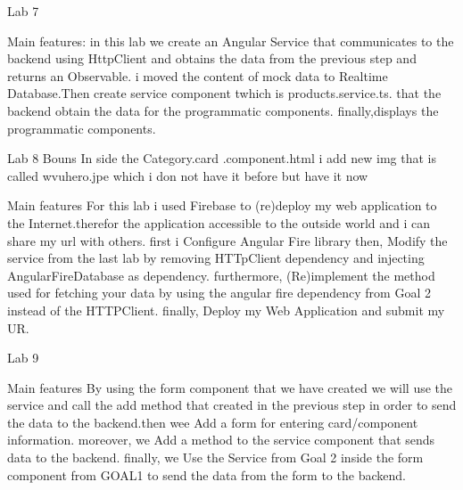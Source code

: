 Lab 7

Main features:
in this lab we create an Angular Service that communicates to the backend using HttpClient and obtains the data from the previous step and returns an Observable. 
i moved the content of mock data to Realtime Database.Then create service component twhich  is products.service.ts. that the backend obtain the data for the programmatic components.
finally,displays the programmatic components.



Lab 8
 Bouns 
 In side the Category.card .component.html i add new img that is called wvuhero.jpe which i don not have it before but have it now 

 Main features
 For this lab i used Firebase to (re)deploy my web application to the Internet.therefor the application accessible to the outside world and i can share my url with others.
first i Configure Angular Fire library then, Modify the service from the last lab by removing HTTpClient dependency and injecting AngularFireDatabase as dependency.
furthermore, (Re)implement the method used for fetching your data by using the angular fire dependency from Goal 2 instead of the HTTPClient.
finally,  Deploy my Web Application and submit my UR.

 Lab 9

 Main features
 By using the form component that we have  created we will use the service and call the add method that created in the previous 
 step in order to send the data to the backend.then wee Add a form for entering card/component information.
moreover, we Add a method to the service component that sends data to the backend. finally, we
Use the Service from Goal 2 inside the form component from GOAL1 to send the data from the form to the backend.

